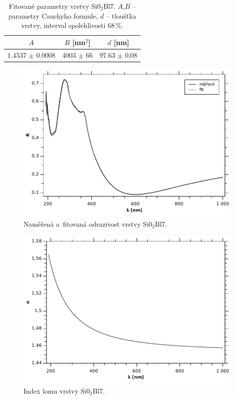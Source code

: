 \documentclass[12pt]{article}
\begin{document}
\begin{table}[htbp]
\begin{center}
\begin{tabular}{|c|c|c|}
\hline
$A$ & $B$ [nm$^2$] &  $d$ [nm] \\ \hline
1.4537 $\pm$ 0.0008 & 4003 $\pm$ 66 & 97.63 $\pm$ 0.08 \\ \hline
\end{tabular}
\caption{Fitované parametry vrstvy Si0$_2$Bl7. $A$,$B$ -- parametry Cauchyho formule, $d$ -- tloušťka vrstvy, interval spolehlivosti 68\,\%.}
\label{sio2fit}
\end{center}
\end{table}

\begin{figure}
  \centering
  \includegraphics[width=135mm]{img/Sio2-R.pdf}
  \caption{Naměřená a~fitovaná odrazivost vrstvy Si0$_2$Bl7.}
  \label{Sio2-R}
\end{figure}

\begin{figure}
  \centering
  \includegraphics[width=135mm]{img/Sio2-n.pdf}
  \caption{Index lomu vrstvy Si0$_2$Bl7.}
  \label{Sio2n}
\end{figure}
\end{document}

